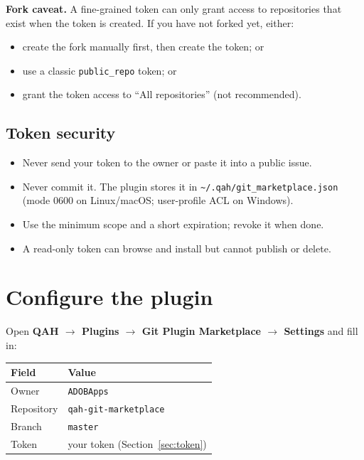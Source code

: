 \documentclass[11pt,a4paper]{article}
\newcommand{\code}[1]{\texttt{#1}}
\begin{document}
\textbf{Fork caveat.} A fine-grained token can only grant access to repositories
that exist when the token is created. If you have not forked yet, either:
\begin{itemize}[leftmargin=1.5em]
  \item create the fork manually first, then create the token; or
  \item use a classic \code{public\_repo} token; or
  \item grant the token access to ``All repositories'' (not recommended).
\end{itemize}

\subsection{Token security}

\begin{itemize}[leftmargin=1.5em]
  \item Never send your token to the owner or paste it into a public issue.
  \item Never commit it. The plugin stores it in
        \code{\textasciitilde/.qah/git\_marketplace.json} (mode 0600 on
        Linux/macOS; user-profile ACL on Windows).
  \item Use the minimum scope and a short expiration; revoke it when done.
  \item A read-only token can browse and install but cannot publish or delete.
\end{itemize}

\section{Configure the plugin}

Open \textbf{QAH $\rightarrow$ Plugins $\rightarrow$ Git Plugin Marketplace
$\rightarrow$ Settings} and fill in:

\begin{center}
\begin{tabular}{@{}ll@{}}
\toprule
Field & Value \\
\midrule
Owner & \code{ADOBApps} \\
Repository & \code{qah-git-marketplace} \\
Branch & \code{master} \\
Token & your token (Section~\ref{sec:token}) \\
\bottomrule
\end{tabular}
\end{center}
\end{document}
